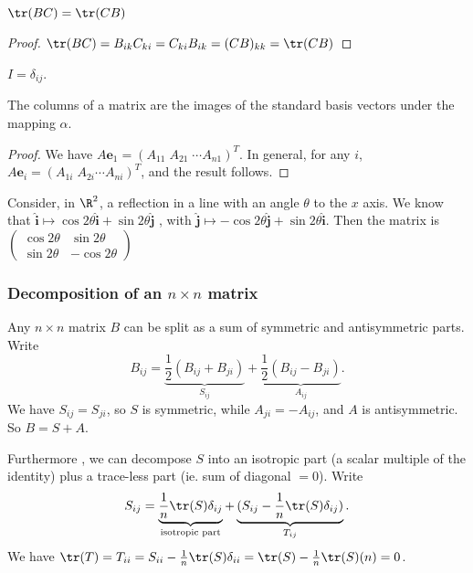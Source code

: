 \documentclass[a4paper]{article}
\begin{document}
\begin{prop}
  $\tr(BC) = \tr(CB)$
\end{prop}

\begin{proof}
  $\tr(BC) = B_{ik}C_{ki} = C_{ki}B_{ik} = (CB)_{kk} = \tr(CB)$
\end{proof}

\begin{defi}
  $I = \delta_{ij}$.
\end{defi}

\begin{prop}
  The columns of a matrix are the images of the standard basis vectors under the mapping $\alpha$.
\end{prop}

\begin{proof}
  We have $A\mathbf{e}_1 = (A_{11}\; A_{21}\; \cdots A_{n1})^T$. In general, for any $i$, $A\mathbf{e}_i = (A_{1i}\; A_{2i}\cdots A_{ni})^T$, and the result follows.
\end{proof}

\begin{eg}
  Consider, in $\R^2$, a reflection in a line with an angle $\theta$ to the $x$ axis. We know that $\mathbf{\hat{i}}\mapsto \cos 2\theta \mathbf{\hat{i}} + \sin 2\theta\mathbf{\hat j}$ , with $\mathbf{\hat{j}}\mapsto -\cos 2\theta \mathbf{\hat{j}} + \sin 2\theta\mathbf{\hat i}$. Then the matrix is
  $\begin{pmatrix}
    \cos 2\theta & \sin 2\theta\\
    \sin 2\theta & -\cos 2\theta
  \end{pmatrix}$
\end{eg}

\subsubsection{Decomposition of an \texorpdfstring{$n\times n$}{n x n} matrix}
Any $n\times n$ matrix $B$ can be split as a sum of symmetric and antisymmetric parts. Write
\[
  B_{ij} = \underbrace{\frac{1}{2}(B_{ij} + B_{ji})}_{S_{ij}} + \underbrace{\frac{1}{2}(B_{ij} - B_{ji})}_{A_{ij}}.
\]
We have $S_{ij} = S_{ji}$, so $S$ is symmetric, while $A_{ji} = -A_{ij}$, and $A$ is antisymmetric. So $B = S + A$.

Furthermore , we can decompose $S$ into an isotropic part (a scalar multiple of the identity) plus a trace-less part (ie. sum of diagonal $= 0$). Write
\[
  S_{ij} = \underbrace{\frac{1}{n}\tr (S)\delta_{ij}}_{\text{isotropic part}} + \underbrace{(S_{ij} - \frac{1}{n}\tr(S)\delta_{ij})}_{T_{ij}}.
\]
We have $\tr(T) = T_{ii} = S_{ii} - \frac{1}{n}\tr(S)\delta_{ii} = \tr(S) - \frac{1}{n}\tr(S)(n) = 0$.
\end{document}

